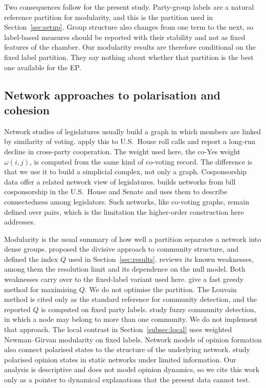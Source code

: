 \documentclass[a4paper,fleqn,oneside]{cas-sc}
\theoremstyle{definition}
\theoremstyle{plain}
\begin{document}
Two consequences follow for the present study. Party-group labels are a
natural reference partition for modularity, and this is the partition used in
Section~\ref{sec:setup}. Group structure also changes from one term to the
next, so label-based measures should be reported with their stability and not
as fixed features of the chamber. Our modularity results are therefore
conditional on the fixed label partition. They say nothing about whether that
partition is the best one available for the EP.

\subsection{Network approaches to polarisation and cohesion}

Network studies of legislatures usually build a graph in which members are
linked by similarity of voting. \citet{AndrisEtAl2015} apply this to U.S.\
House roll calls and report a long-run decline in cross-party cooperation.
The weight used here, the co-Yes weight $\omega(i,j)$, is computed from the
same kind of co-voting record. The difference is that we use it to build a
simplicial complex, not only a graph. Cosponsorship data offer a related network view of legislatures. \citet{Fowler2006} builds networks from bill cosponsorship in the U.S.\ House and Senate and uses them to describe connectedness among legislators. Such networks, like co-voting graphs, remain defined over pairs, which is the limitation the higher-order construction here addresses.

Modularity is the usual summary of how well a partition separates a network
into dense groups. \citet{GirvanNewman2002} proposed the divisive approach to
community structure, and \citet{NewmanGirvan2004} defined the index $Q$ used
in Section~\ref{sec:results}. \citet{Fortunato2010} reviews its known
weaknesses, among them the resolution limit and its dependence on the null
model. Both weaknesses carry over to the fixed-label variant used here.
\citet{BlondelEtAl2008} give a fast greedy method for maximising $Q$. We do not
optimise the partition. The Louvain method is cited only as the standard
reference for community detection, and the reported $Q$ is computed on fixed
party labels. \citet{ZhangWangZhang2007} study fuzzy community detection, in
which a node may belong to more than one community. We do not implement that
approach. The local contrast in Section~\ref{subsec:local} uses weighted
Newman--Girvan modularity on fixed labels. Network models of opinion formation also connect polarised states to the structure of the underlying network. \citet{PerezMartinezEtAl2023} study polarised opinion states in static networks under limited information. Our analysis is descriptive and does not model opinion dynamics, so we cite this work only as a pointer to dynamical explanations that the present data cannot test.
\end{document}
